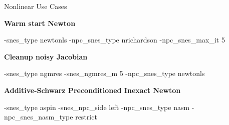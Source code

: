 \begin{frame}[fragile]{Nonlinear Use Cases}

{\bf Warm start Newton}
\begin{semiverbatim}
  -snes_type newtonls
  -npc_snes_type nrichardson -npc_snes_max_it 5
\end{semiverbatim}

{\bf Cleanup noisy Jacobian}
\begin{semiverbatim}
  -snes_type ngmres -snes_ngmres_m 5
  -npc_snes_type newtonls
\end{semiverbatim}

{\bf Additive-Schwarz Preconditioned Inexact Newton}
\begin{semiverbatim}
  -snes_type aspin -snes_npc_side left
  -npc_snes_type nasm -npc_snes_nasm_type restrict
\end{semiverbatim}
\end{frame}
